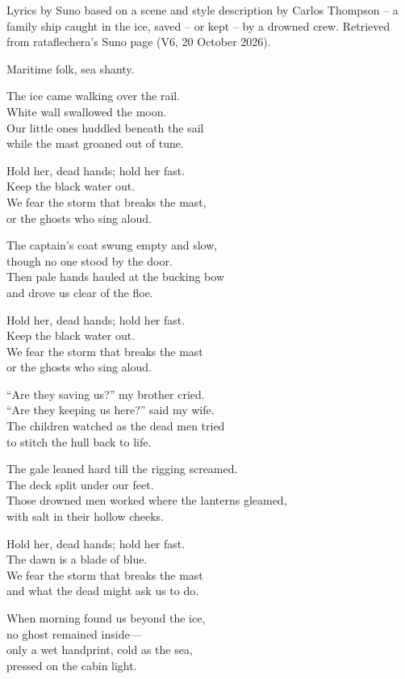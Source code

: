
\begin{notes}
Lyrics by Suno based on a scene and style description by Carlos Thompson -- a family ship caught in the ice, saved -- or kept -- by a drowned crew. Retrieved from rataflechera's Suno page (V6, 20 October 2026).
\end{notes}
\begin{style}
Maritime folk, sea shanty.
\end{style}
\begin{lyrics}
The ice came walking over the rail.\\
White wall swallowed the moon.\\
Our little ones huddled beneath the sail\\
while the mast groaned out of tune.

Hold her, dead hands; hold her fast.\\
Keep the black water out.\\
We fear the storm that breaks the mast,\\
or the ghosts who sing aloud.

The captain’s coat swung empty and slow,\\
though no one stood by the door.\\
Then pale hands hauled at the bucking bow\\
and drove us clear of the floe.

Hold her, dead hands; hold her fast.\\
Keep the black water out.\\
We fear the storm that breaks the mast\\
or the ghosts who sing aloud.

“Are they saving us?” my brother cried.\\
“Are they keeping us here?” said my wife.\\
The children watched as the dead men tried\\
to stitch the hull back to life.

The gale leaned hard till the rigging screamed.\\
The deck split under our feet.\\
Those drowned men worked where the lanterns gleamed,\\
with salt in their hollow cheeks.

Hold her, dead hands; hold her fast.\\
The dawn is a blade of blue.\\
We fear the storm that breaks the mast\\
and what the dead might ask us to do.

When morning found us beyond the ice,\\
no ghost remained inside—\\
only a wet handprint, cold as the sea,\\
pressed on the cabin light.
\end{lyrics}

